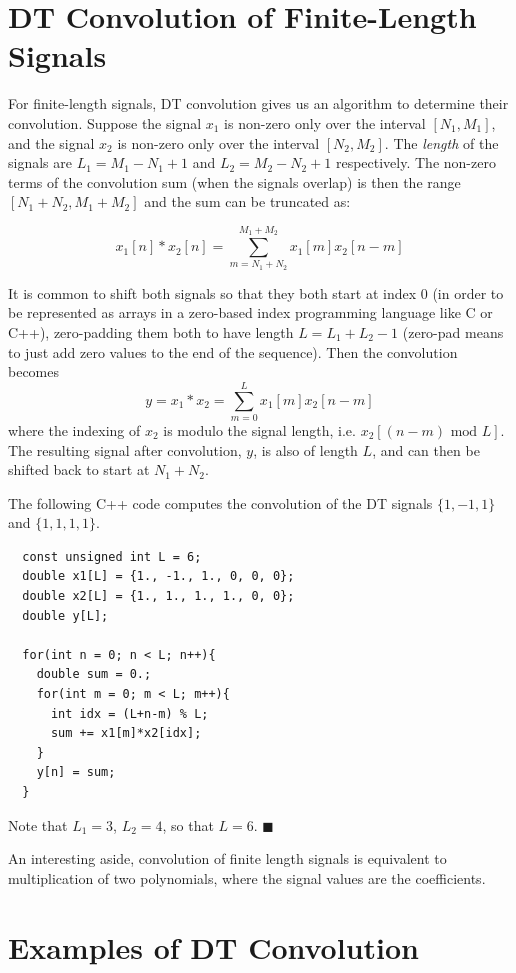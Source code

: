 \section{DT Convolution of Finite-Length Signals}

For finite-length signals, DT convolution gives us an algorithm to determine their convolution. Suppose the signal $x_1$ is non-zero only over the interval $[N_1,M_1]$, and the signal $x_2$ is non-zero only over the interval $[N_2,M_2]$. The \emph{length} of the signals are $L_1 = M_1-N_1+1$ and $L_2 = M_2-N_2+1$ respectively. The non-zero terms of the convolution sum (when the signals overlap) is then the range $[N_1+N_2,M_1+M_2]$ and the sum can be truncated as:

\[
x_1[n] * x_2[n] = \sum\limits_{m = N_1+N_2}^{M_1+M_2} x_1[m]x_2[n-m]
\]

It is common to shift both signals so that they both start at index $0$ (in order to be represented as arrays in a zero-based index programming language like C or C++), zero-padding them both to have length $L=L_1+L_2-1$ (zero-pad means to just add zero values to the end of the sequence). Then the convolution becomes
\[
y = x_1 * x_2 = \sum\limits_{m = 0}^{L} x_1[m]x_2[n-m]
\]
where the indexing of $x_2$ is modulo the signal length, i.e. $x_2[(n-m) \mbox{ mod } L]$. The resulting signal after convolution, $y$, is also of length $L$, and can then be shifted back to start at $N_1+N_2$.

\begin{example} The following C++ code computes the convolution of the DT signals $\{1,-1,1\}$ and $\{1,1,1,1\}$.
\begin{verbatim}
  const unsigned int L = 6;
  double x1[L] = {1., -1., 1., 0, 0, 0};
  double x2[L] = {1., 1., 1., 1., 0, 0};
  double y[L];

  for(int n = 0; n < L; n++){
    double sum = 0.;
    for(int m = 0; m < L; m++){
      int idx = (L+n-m) % L;
      sum += x1[m]*x2[idx];
    }
    y[n] = sum;
  }
\end{verbatim}
Note that $L_1 = 3$, $L_2 = 4$, so that $L=6$.
$\blacksquare$
\end{example}

An interesting aside, convolution of finite length signals is equivalent to multiplication of two polynomials, where the signal values are the coefficients.

\section{Examples of DT Convolution}

